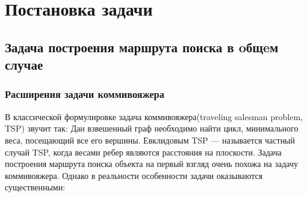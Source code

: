 \chapter{Постановка задачи}
\label{chapSVD}

\section{Задача построения маршрута поиска в oбщeм случае}


\subsection{Расширения задачи коммивояжера}
В классической формулировке задача коммивояжера(traveling salesman problem, TSP) \cite{app07} звучит
 так:
 Дан взвешенный граф необходимо найти цикл, минимального веса, посещающий все его вершины.
 Евклидовым TSP --- называется частный случай TSP, когда весами ребер являются
расстояния на плоскости. 
 Задача построения маршрута поиска объекта на первый взгляд очень похожа на задачу коммивояжера.
Однако в реальности особенности задачи оказываются существенными:

